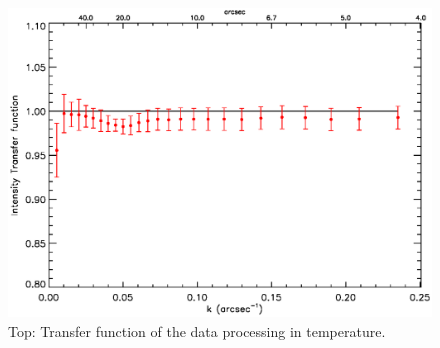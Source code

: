 \documentclass[twocolumn,traditabstract]{aa}
\begin{document}
\begin{figure}[h!]
  \centering
  \includegraphics[width=0.7\linewidth,keepaspectratio]{figures/Crab_transfer_func.eps}
	\caption{Top: Transfer function of the data processing in temperature.}
\label{transfer_func}
\end{figure}
  
\end{document}
